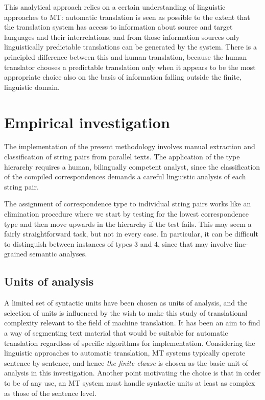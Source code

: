 \documentclass[output=paper]{LSP/langsci}
\begin{document}
This analytical approach relies on a certain understanding of linguistic approaches to MT: automatic translation is seen as possible to the extent that the translation system has access to information about source and target languages and their interrelations, and from those information sources only linguistically predictable translations can be generated by the system. There is a principled difference between this and human translation, because the human translator chooses a predictable translation only when it appears to be the most appropriate choice also on the basis of information falling outside the finite, linguistic domain.

\section{Empirical investigation}\label{sec:thunes:4}

The implementation of the present methodology involves manual extraction and classification of string pairs from parallel texts. The application of the type hierarchy requires a human, bilingually competent analyst, since the classification of the compiled correspondences demands a careful linguistic analysis of each string pair. 

The assignment of correspondence type to individual string pairs works like an elimination procedure where we start by testing for the lowest correspondence type and then move upwards in the hierarchy if the test fails. This may seem a fairly straightforward task, but not in every case. In particular, it can be difficult to distinguish between instances of types 3 and 4, since that may involve fine-grained semantic analyses.

\subsection{Units of analysis}\label{sec:thunes:4.1}

A limited set of syntactic units have been chosen as units of analysis, and the selection of units is influenced by the wish to make this study of translational complexity relevant to the field of machine translation. It has been an aim to find a way of segmenting text material that would be suitable for automatic translation regardless of specific algorithms for implementation. Considering the linguistic approaches to automatic translation, MT systems typically operate sentence by sentence, and hence \textit{the finite clause} is chosen as the basic unit of analysis in this investigation. Another point motivating the choice is that in order to be of any use, an MT system must handle syntactic units at least as complex as those of the sentence level.
\end{document}
